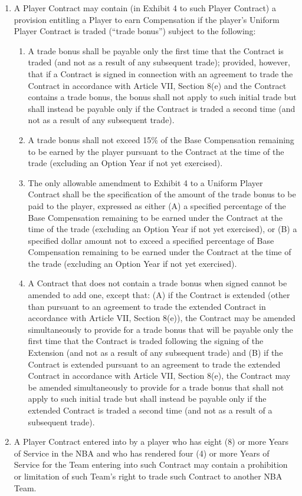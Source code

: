 \documentclass[
]{book}
\providecommand{\tightlist}{%
  \setlength{\itemsep}{0pt}\setlength{\parskip}{0pt}}
\begin{document}
\begin{enumerate}
\def\labelenumi{(\alph{enumi})}
\tightlist
\item
  A Player Contract may contain (in Exhibit 4 to such Player Contract) a provision entitling a Player to earn Compensation if the player's Uniform Player Contract is traded (``trade bonus'') subject to the following:

  \begin{enumerate}
  \def\labelenumii{(\roman{enumii})}
  \tightlist
  \item
    A trade bonus shall be payable only the first time that the Contract is traded (and not as a result of any subsequent trade); provided, however, that if a Contract is signed in connection with an agreement to trade the Contract in accordance with Article VII, Section 8(e) and the Contract contains a trade bonus, the bonus shall not apply to such initial trade but shall instead be payable only if the Contract is traded a second time (and not as a result of any subsequent trade).
  \item
    A trade bonus shall not exceed 15\% of the Base Compensation remaining to be earned by the player pursuant to the Contract at the time of the trade (excluding an Option Year if not yet exercised).
  \item
    The only allowable amendment to Exhibit 4 to a Uniform Player Contract shall be the specification of the amount of the trade bonus to be paid to the player, expressed as either (A) a specified percentage of the Base Compensation remaining to be earned under the Contract at the time of the trade (excluding an Option Year if not yet exercised), or (B) a specified dollar amount not to exceed a specified percentage of Base Compensation remaining to be earned under the Contract at the time of the trade (excluding an Option Year if not yet exercised).
  \item
    A Contract that does not contain a trade bonus when signed cannot be amended to add one, except that: (A) if the Contract is extended (other than pursuant to an agreement to trade the extended Contract in accordance with Article VII, Section 8(e)), the Contract may be amended simultaneously to provide for a trade bonus that will be payable only the first time that the Contract is traded following the signing of the Extension (and not as a result of any subsequent trade) and (B) if the Contract is extended pursuant to an agreement to trade the extended Contract in accordance with Article VII, Section 8(e), the Contract may be amended simultaneously to provide for a trade bonus that shall not apply to such initial trade but shall instead be payable only if the extended Contract is traded a second time (and not as a result of a subsequent trade).
  \end{enumerate}
\item
  A Player Contract entered into by a player who has eight (8) or more Years of Service in the NBA and who has rendered four (4) or more Years of Service for the Team entering into such Contract may contain a prohibition or limitation of such Team's right to trade such Contract to another NBA Team.
\end{enumerate}
\end{document}
